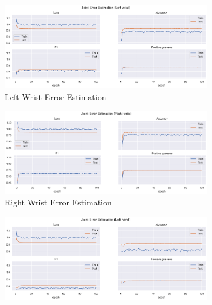   
  \begin{figure}[!ht]
    \centering
    \begin{subfigure}[b]{0.47\linewidth}
        \centering
        \includegraphics[width=\textwidth]{figures/Results/v2_bs_40_is_64_e_100/jt/Left wrist_ErrorEstimation.png}
        \caption{Left Wrist Error Estimation}
        \label{fig:v2_lewr_jt_ee}
    \end{subfigure}
    \hfill
    \begin{subfigure}[b]{0.47\linewidth}
        \centering
        \includegraphics[width=\textwidth]{figures/Results/v2_bs_40_is_64_e_100/jt/Right wrist_ErrorEstimation.png}
        \caption{Right Wrist Error Estimation}
        \label{fig:v2_riwr_jt_ee}
    \end{subfigure}
    \hfill
    \begin{subfigure}[b]{0.47\linewidth}
        \centering
        \includegraphics[width=\textwidth]{figures/Results/v2_bs_40_is_64_e_100/jt/Left hand_ErrorEstimation.png}

\end{subfigure}
\end{figure}

